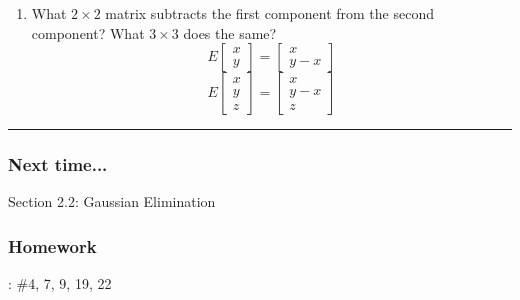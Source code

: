 \begin{enumerate}
\begin{enumerate}
		\item What $2 \times 2$ matrix subtracts the first component from the second component? 
		What $3 \times 3$  does the same? 
		\[ E \begin{bmatrix} x \\ y \end{bmatrix} = \begin{bmatrix} x \\ y-x \end{bmatrix} \]
		\[ E \begin{bmatrix} x \\ y \\ z \end{bmatrix} = \begin{bmatrix} x \\ y-x \\ z \end{bmatrix} \]
	
		
	\end{enumerate}
\end{enumerate}






\rule[0.01in]{\textwidth}{0.0025in}


\subsubsection*{Next time...}
Section 2.2: Gaussian Elimination





\subsubsection*{Homework}
: \#4, 7, 9, 19, 22












